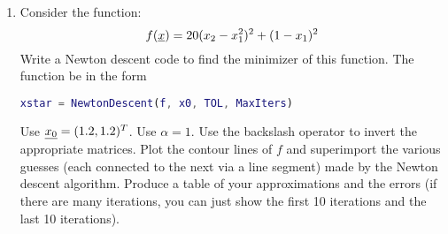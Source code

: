\documentclass[11pt, oneside]{article}
\begin{document}
\begin{enumerate}
  \item %
    Consider the function:
    \[
      f(\underline{x}) = 20(x_2 - x_1^2)^2 + (1 - x_1)^2
    \]
    Write a \MATLAB Newton descent code to find the minimizer of this function.
    The function be in the form
    \begin{lstlisting}[language=MATLAB, frame=none]
      xstar = NewtonDescent(f, x0, TOL, MaxIters)
    \end{lstlisting}
    Use $\underline{x_0} = (1.2, 1.2)^T$.
    Use $\alpha = 1$.
    Use the backslash operator to invert the appropriate matrices.
    Plot the contour lines of $f$ and superimport the various guesses (each
    connected to the next via a line segment) made by the Newton descent
    algorithm.
    Produce a table of your approximations and the errors (if there are many
    iterations, you can just show the first 10 iterations and the last 10
    iterations).

\end{enumerate}
\end{document}
